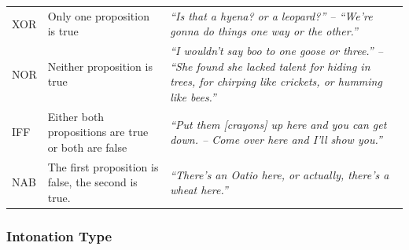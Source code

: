 \documentclass[oneside]{report}
\theoremstyle{definition}
\theoremstyle{definition}
\theoremstyle{definition}
\theoremstyle{remark}
\begin{document}
\begin{longtable}[]{@{}lll@{}}
\begin{minipage}[t]{0.07\columnwidth}
XOR\strut
\end{minipage} & \begin{minipage}[t]{0.36\columnwidth}\raggedright\strut
Only one proposition is true\strut
\end{minipage} & \begin{minipage}[t]{0.48\columnwidth}\raggedright\strut
\emph{``Is that a hyena? or a leopard?'' -- ``We're gonna do things one
way or the other.''}\strut
\end{minipage}\tabularnewline
\begin{minipage}[t]{0.07\columnwidth}\raggedright\strut
NOR\strut
\end{minipage} & \begin{minipage}[t]{0.36\columnwidth}\raggedright\strut
Neither proposition is true\strut
\end{minipage} & \begin{minipage}[t]{0.48\columnwidth}\raggedright\strut
\emph{``I wouldn't say boo to one goose or three.'' -- ``She found she
lacked talent for hiding in trees, for chirping like crickets, or
humming like bees.''}\strut
\end{minipage}\tabularnewline
\begin{minipage}[t]{0.07\columnwidth}\raggedright\strut
IFF\strut
\end{minipage} & \begin{minipage}[t]{0.36\columnwidth}\raggedright\strut
Either both propositions are true or both are false\strut
\end{minipage} & \begin{minipage}[t]{0.48\columnwidth}\raggedright\strut
\emph{``Put them {[}crayons{]} up here and you can get down. -- Come
over here and I'll show you.''}\strut
\end{minipage}\tabularnewline
\begin{minipage}[t]{0.07\columnwidth}\raggedright\strut
NAB\strut
\end{minipage} & \begin{minipage}[t]{0.36\columnwidth}\raggedright\strut
The first proposition is false, the second is true.\strut
\end{minipage} & \begin{minipage}[t]{0.48\columnwidth}\raggedright\strut
\emph{``There's an Oatio here, or actually, there's a wheat
here.''}\strut
\end{minipage}\tabularnewline
\bottomrule
\end{longtable}
\subsubsection{Intonation Type}\label{intonation-type}
\end{document}
